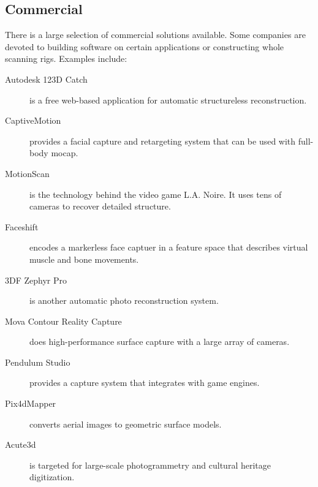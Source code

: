 \subsection{Commercial}

There is a large selection of commercial solutions available. Some companies are devoted to building software on certain applications or constructing whole scanning rigs. Examples include:
\begin{description}
\item[Autodesk 123D Catch] is a free web-based application for automatic structureless reconstruction.
\item[CaptiveMotion] provides a facial capture and retargeting system that can be used with full-body mocap.
\item[MotionScan] is the technology behind the video game L.A. Noire. \cite{rockstar2011noire} It uses tens of cameras to recover detailed structure.
\item[Faceshift] encodes a markerless face captuer in a feature space that describes virtual muscle and bone movements.
\item[3DF Zephyr Pro] is another automatic photo reconstruction system.
\item[Mova Contour Reality Capture] does high-performance surface capture with a large array of cameras.
\item[Pendulum Studio] provides a capture system that integrates with game engines.
\item[Pix4dMapper] converts aerial images to geometric surface models.
\item[Acute3d] is targeted for large-scale photogrammetry and cultural heritage digitization.
\end{description}
